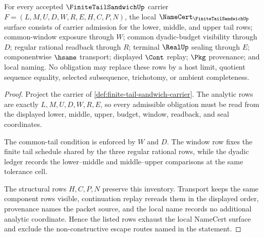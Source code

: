 \begin{theorem}
\label{thm:finite-tail-sandwich-namecert-obligations}
For every accepted $\FiniteTailSandwichUp$ carrier $F=(L,M,U,D,W,R,E,H,C,P,N)$, the local $\NameCert_{\FiniteTailSandwichUp}$ surface consists of carrier admission for the lower, middle, and upper tail rows; common-window exposure through $W$; common dyadic-budget visibility through $D$; regular rational readback through $R$; terminal $\RealUp$ sealing through $E$; componentwise $\hsame$ transport; displayed $\Cont$ replay; $\Pkg$ provenance; and local naming. No obligation may replace these rows by a host limit, quotient sequence equality, selected subsequence, trichotomy, or ambient completeness.
\end{theorem}
\begin{proof}
Project the carrier of \autoref{def:finite-tail-sandwich-carrier}. The analytic rows are exactly $L,M,U,D,W,R,E$, so every admissible obligation must be read from the displayed lower, middle, upper, budget, window, readback, and seal coordinates.

The common-tail condition is enforced by $W$ and $D$. The window row fixes the finite tail schedule shared by the three regular rational rows, while the dyadic ledger records the lower--middle and middle--upper comparisons at the same tolerance cell.

The structural rows $H,C,P,N$ preserve this inventory. Transport keeps the same component rows visible, continuation replay rereads them in the displayed order, provenance names the packet source, and the local name records no additional analytic coordinate. Hence the listed rows exhaust the local NameCert surface and exclude the non-constructive escape routes named in the statement.
\end{proof}

